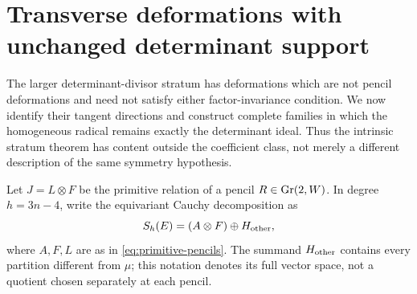 \documentclass[11pt,reqno]{amsart}
\numberwithin{equation}{section}
\theoremstyle{definition}\newtheorem{definition}[theorem]{Definition}
\theoremstyle{remark}\newtheorem{remark}[theorem]{Remark}
\begin{document}

\section{Transverse deformations with unchanged determinant support}
\label{sec:transverse-relations}

The larger determinant-divisor stratum has deformations which are
not pencil deformations and need not satisfy either factor-invariance
condition.  We now identify their tangent directions and construct
complete families in which the homogeneous radical remains exactly
the determinant ideal.  Thus the intrinsic stratum theorem has content
outside the coefficient class, not merely a different description
of the same symmetry hypothesis.

Let \(J=L\otimes F\) be the primitive relation of a pencil
\(R\in\operatorname{Gr}(2,W)\).  In degree \(h=3n-4\), write the equivariant
Cauchy decomposition as
\[
                    S_h(E)=(A\otimes F)\oplus H_{\rm other},
\]
where \(A,F,L\) are as in \eqref{eq:primitive-pencils}.
The summand \(H_{\rm other}\) contains every partition different
from \(\mu\); this notation denotes its full vector space, not a
quotient chosen separately at each pencil.
\end{document}

